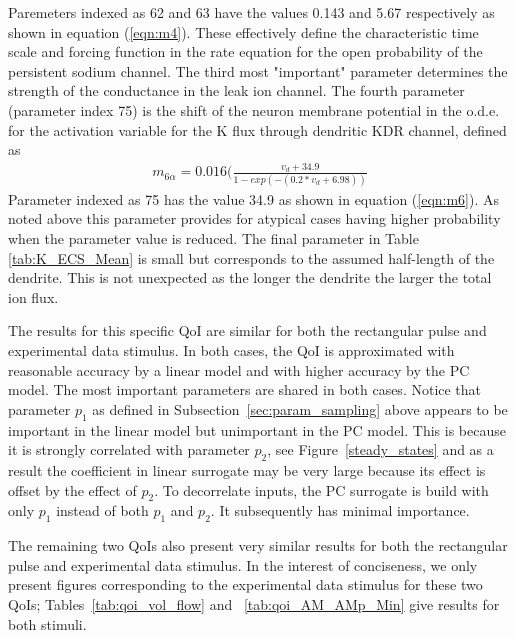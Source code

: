 Paremeters indexed as 62 and 63 have the values 0.143 and 5.67 respectively as shown in equation (\ref{eqn:m4}). These effectively define the characteristic time scale and forcing function in the rate equation for the open  probability of the persistent sodium channel. The third most "important" parameter determines the strength of the  conductance in the \pot leak ion channel. The fourth parameter (parameter index 75) is the shift of the neuron membrane potential in the o.d.e. for the activation variable for the  K flux through dendritic KDR channel, defined as 
\begin{eqnarray}\label{eqn:m6}
m_{6  \alpha}     = 0.016 (\frac{v_d + 34.9}{1 - exp(-(0.2 * v_d + 6.98))} 
\end{eqnarray}
Parameter indexed as 75 has the value 34.9 as shown in equation (\ref{eqn:m6}). As noted above this parameter provides for atypical cases having higher probability when the parameter value is reduced. The final parameter in Table \ref{tab:K_ECS_Mean} is small but corresponds to the assumed half-length of the dendrite. This is not unexpected as the longer the dendrite the larger the total ion flux. 

The results for this specific QoI are similar for both the rectangular pulse and experimental data stimulus. In both cases, the QoI is approximated with reasonable accuracy by a linear model and with higher accuracy by the PC model. The most important parameters are shared in both cases. Notice that parameter $p_1$ as defined in Subsection~\ref{sec:param_sampling} above appears to be important in the linear model but unimportant in the PC model. This is because it is strongly correlated with parameter $p_2$, see Figure~\ref{steady_states}  and as a result the coefficient in linear surrogate may be very large because its effect is offset by the effect of $p_2$. To decorrelate inputs, the PC surrogate is build with only $p_1$ instead of both $p_1$ and $p_2$. It subsequently has minimal importance.

The remaining two QoIs also present very similar results for both the rectangular pulse and experimental data stimulus. In the interest of conciseness, we only present figures corresponding to the experimental data stimulus for these two QoIs; Tables~\ref{tab:qoi_vol_flow} and ~\ref{tab:qoi_AM_AMp_Min} give results for both stimuli. 

